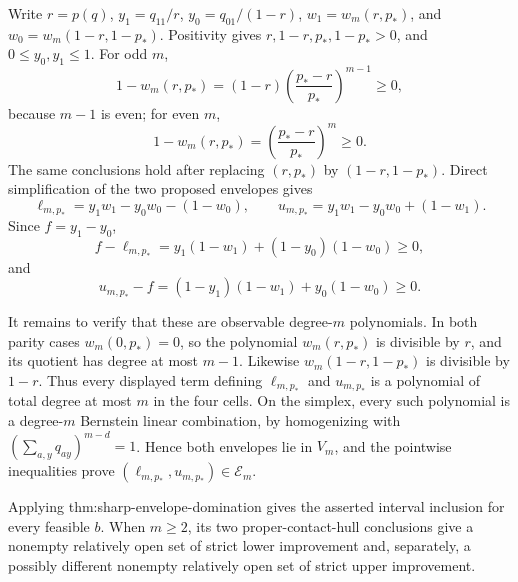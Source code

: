 Write \(r=p(q)\), \(y_1=q_{11}/r\), \(y_0=q_{01}/(1-r)\), \(w_1=w_m(r,p_*)\), and \(w_0=w_m(1-r,1-p_*)\).  Positivity gives \(r,1-r,p_*,1-p_*>0\), and \(0\leq y_0,y_1\leq1\).  For odd \(m\),
\[
 1-w_m(r,p_*)=(1-r)\left(\frac{p_*-r}{p_*}\right)^{m-1}\geq0,
\]
because \(m-1\) is even; for even \(m\),
\[
 1-w_m(r,p_*)=\left(\frac{p_*-r}{p_*}\right)^m\geq0.
\]
The same conclusions hold after replacing \((r,p_*)\) by \((1-r,1-p_*)\).  Direct simplification of the two proposed envelopes gives
\[
 \ell_{m,p_*}=y_1w_1-y_0w_0-(1-w_0),
 \qquad
 u_{m,p_*}=y_1w_1-y_0w_0+(1-w_1).
\]
Since \(f=y_1-y_0\),
\[
 f-\ell_{m,p_*}=y_1(1-w_1)+(1-y_0)(1-w_0)\geq0,
\]
and
\[
 u_{m,p_*}-f=(1-y_1)(1-w_1)+y_0(1-w_0)\geq0.
\]

It remains to verify that these are observable degree-\(m\) polynomials.  In both parity cases \(w_m(0,p_*)=0\), so the polynomial \(w_m(r,p_*)\) is divisible by \(r\), and its quotient has degree at most \(m-1\).  Likewise \(w_m(1-r,1-p_*)\) is divisible by \(1-r\).  Thus every displayed term defining \(\ell_{m,p_*}\) and \(u_{m,p_*}\) is a polynomial of total degree at most \(m\) in the four cells.  On the simplex, every such polynomial is a degree-\(m\) Bernstein linear combination, by homogenizing with \((\sum_{a,y}q_{ay})^{m-d}=1\).  Hence both envelopes lie in \(V_m\), and the pointwise inequalities prove \((\ell_{m,p_*},u_{m,p_*})\in\mathcal E_m\).

Applying thm:sharp-envelope-domination gives the asserted interval inclusion for every feasible \(b\).  When \(m\geq2\), its two proper-contact-hull conclusions give a nonempty relatively open set of strict lower improvement and, separately, a possibly different nonempty relatively open set of strict upper improvement.